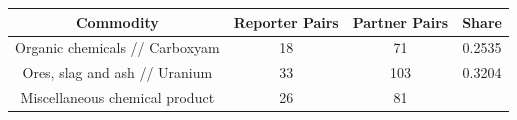 \documentclass[10pt,]{article}
\begin{document}
\begin{longtable}[]{@{}cccc@{}}
\toprule
\begin{minipage}[b]{0.38\columnwidth}\centering\strut
Commodity\strut
\end{minipage} & \begin{minipage}[b]{0.21\columnwidth}\centering\strut
Reporter Pairs\strut
\end{minipage} & \begin{minipage}[b]{0.20\columnwidth}\centering\strut
Partner Pairs\strut
\end{minipage} & \begin{minipage}[b]{0.09\columnwidth}\centering\strut
Share\strut
\end{minipage}\tabularnewline
\midrule
\endhead
\begin{minipage}[t]{0.38\columnwidth}\centering\strut
Organic chemicals // Carboxyam\strut
\end{minipage} & \begin{minipage}[t]{0.21\columnwidth}\centering\strut
18\strut
\end{minipage} & \begin{minipage}[t]{0.20\columnwidth}\centering\strut
71\strut
\end{minipage} & \begin{minipage}[t]{0.09\columnwidth}\centering\strut
0.2535\strut
\end{minipage}\tabularnewline
\begin{minipage}[t]{0.38\columnwidth}\centering\strut
Ores, slag and ash // Uranium\strut
\end{minipage} & \begin{minipage}[t]{0.21\columnwidth}\centering\strut
33\strut
\end{minipage} & \begin{minipage}[t]{0.20\columnwidth}\centering\strut
103\strut
\end{minipage} & \begin{minipage}[t]{0.09\columnwidth}\centering\strut
0.3204\strut
\end{minipage}\tabularnewline
\begin{minipage}[t]{0.38\columnwidth}\centering\strut
Miscellaneous chemical product\strut
\end{minipage} & \begin{minipage}[t]{0.21\columnwidth}\centering\strut
26\strut
\end{minipage} & \begin{minipage}[t]{0.20\columnwidth}\centering\strut
81\strut

\end{minipage}
\end{longtable}
\end{document}
